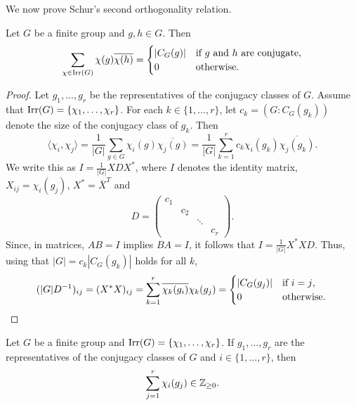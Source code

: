 We now prove Schur's second orthogonality relation. 

\begin{theorem}[Schur]
    Let $G$ be a finite group and $g,h\in G$. 
    Then
    \[
    \sum_{\chi\in\operatorname{Irr}(G)}\chi(g)\overline{\chi(h)}
    =\begin{cases}
    |C_G(g)| & \text{if $g$ and $h$ are conjugate},\\
    0 & \text{otherwise}.
    \end{cases}
    \]
\end{theorem}

\begin{proof}
    Let $g_1,\dots,g_r$ be the representatives of the conjugacy classes of $G$. 
    Assume that $\operatorname{Irr}(G)=\{\chi_1,\dots,\chi_r\}$. For each $k\in\{1,\dots,r\}$, 
    let $c_k=(G:C_G(g_k))$ denote the size of the conjugacy class of $g_k$. Then
    \[
    \langle\chi_i,\chi_j\rangle
    =\frac{1}{|G|}\sum_{g\in G}\chi_i(g)\overline{\chi_j(g)}
    =\frac{1}{|G|}\sum_{k=1}^rc_k\chi_i(g_k)\overline{\chi_j(g_k)}.
    \]
    We write this as $I=\frac{1}{|G|}XDX^*$, where $I$ denotes the identity matrix, 
    $X_{ij}=\chi_i(g_j)$, 
    $X^*=\overline{X}^T$ and 
    \[
    D=\begin{pmatrix}
    c_1\\
    &c_2\\
    &&\ddots\\
    &&&c_r
    \end{pmatrix}.
    \]
    Since, in matrices, $AB=I$ implies $BA=I$, it follows that
    $I=\frac{1}{|G|}X^*XD$. Thus, using that $|G|=c_k|C_G(g_k)|$ 
    holds for all $k$, 
    \[
    (|G|D^{-1})_{ij}=(X^*X)_{ij}=\sum_{k=1}^r\overline{\chi_k(g_i)}\chi_k(g_j)
    =\begin{cases}
    |C_G(g_j)| & \text{if $i=j$},\\
    0 & \text{otherwise}.
    \end{cases}\qedhere
    \]
\end{proof}

\begin{theorem}[Solomon]
    Let $G$ be a finite group and $\operatorname{Irr}(G)=\{\chi_1,\dots,\chi_r\}$. 
    If $g_1,\dots,g_r$ are the representatives of the conjugacy classes
    of $G$ and $i\in\{1,\dots,r\}$, then 
    \[
    \sum_{j=1}^r\chi_i(g_j)\in\mathbb{Z}_{\geq0}.
    \]
\end{theorem}

